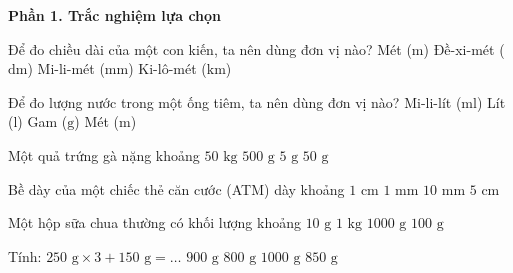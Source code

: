 \textbf{Phần 1. Trắc nghiệm lựa chọn}

\begin{ex} %
Để đo chiều dài của một con kiến, ta nên dùng đơn vị nào?
\choice
{Mét ($\text{m}$)}
{Đề-xi-mét ($\text{dm}$)}
{\True Mi-li-mét ($\text{mm}$)}
{Ki-lô-mét ($\text{km}$)}
\end{ex}

\begin{ex} %
Để đo lượng nước trong một ống tiêm, ta nên dùng đơn vị nào?
\choice
{\True Mi-li-lít ($\text{ml}$)}
{Lít ($\text{l}$)}
{Gam ($\text{g}$)}
{Mét ($\text{m}$)}
\end{ex}

\begin{ex} %
Một quả trứng gà nặng khoảng
\choice
{$50\text{ kg}$}
{$500\text{ g}$}
{$5\text{ g}$}
{\True $50\text{ g}$}
\end{ex}

\begin{ex} %
Bề dày của một chiếc thẻ căn cước (ATM) dày khoảng
\choice
{$1\text{ cm}$}
{\True $1\text{ mm}$}
{$10\text{ mm}$}
{$5\text{ cm}$}
\end{ex}

\begin{ex} %
Một hộp sữa chua thường có khối lượng khoảng
\choice
{$10\text{ g}$}
{$1\text{ kg}$}
{$1000\text{ g}$}
{\True $100\text{ g}$}
\end{ex}

\begin{ex} %
Tính: $250\text{ g} \times 3 + 150\text{ g} = \dots$
\choice
{\True $900\text{ g}$}
{$800\text{ g}$}
{$1000\text{ g}$}
{$850\text{ g}$}
\end{ex}


